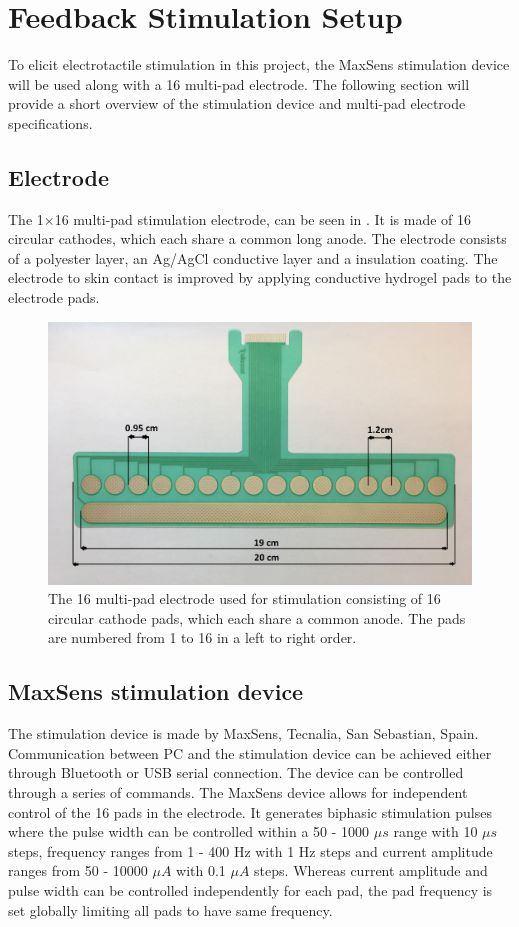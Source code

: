 \section{Feedback Stimulation Setup}

To elicit electrotactile stimulation in this project, the MaxSens stimulation device will be used along with a 16 multi-pad electrode. The following section will provide a short overview of the stimulation device and multi-pad electrode specifications. 
 

\subsection{Electrode}

The 1$\times$16 multi-pad stimulation electrode, can be seen in . It is made of 16 circular cathodes, which each share a common long anode. The electrode consists of a polyester layer, an Ag/AgCl conductive layer and a insulation coating. The electrode to skin contact is improved by applying conductive hydrogel pads to the electrode pads. \cite{Strbac2016}     

\begin{figure}[H]                 
	\includegraphics[width=.57\textwidth]{figures/electrode}  
	\caption{The 16 multi-pad electrode used for stimulation consisting of 16 circular cathode pads, which each share a common anode. The pads are numbered from 1 to 16 in a left to right order.}
	\label{fig:electrode} 
\end{figure}


\subsection{MaxSens stimulation device}

The stimulation device is made by MaxSens, Tecnalia, San Sebastian, Spain. Communication between PC and the stimulation device can be achieved either through Bluetooth or USB serial connection. The device can be controlled through a series of commands. The MaxSens device allows for independent control of the 16 pads in the electrode. It generates biphasic stimulation pulses where the pulse width can be controlled within a 50 - 1000 $\mu s$ range with 10 $\mu s$ steps, frequency ranges from 1 - 400 Hz with 1 Hz steps and current amplitude ranges from 50 - 10000 $\mu A$ with 0.1 $\mu A$ steps. Whereas current amplitude and pulse width can be controlled independently for each pad, the pad frequency is set globally limiting all pads to have same frequency.    